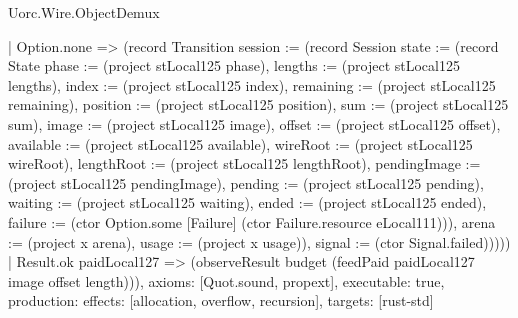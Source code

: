 \begin{lexlean}{Uorc.Wire.ObjectDemux}
\begin{semanticmodule}
{        | Option.none => (record Transition {session := (record Session {state := (record State {phase := (project stLocal125 phase), lengths := (project stLocal125 lengths), index := (project stLocal125 index), remaining := (project stLocal125 remaining), position := (project stLocal125 position), sum := (project stLocal125 sum), image := (project stLocal125 image), offset := (project stLocal125 offset), available := (project stLocal125 available), wireRoot := (project stLocal125 wireRoot), lengthRoot := (project stLocal125 lengthRoot), pendingImage := (project stLocal125 pendingImage), pending := (project stLocal125 pending), waiting := (project stLocal125 waiting), ended := (project stLocal125 ended), failure := (ctor Option.some [Failure] (ctor Failure.resource eLocal111))}), arena := (project x arena), usage := (project x usage)}), signal := (ctor Signal.failed)}))))
    | Result.ok paidLocal127 => (observeResult budget (feedPaid paidLocal127 image offset length))),
  axioms: [Quot.sound, propext],
  executable: true,
  production: {effects: [allocation, overflow, recursion], targets: [rust-std]}
}


\end{semanticmodule}
\end{lexlean}
